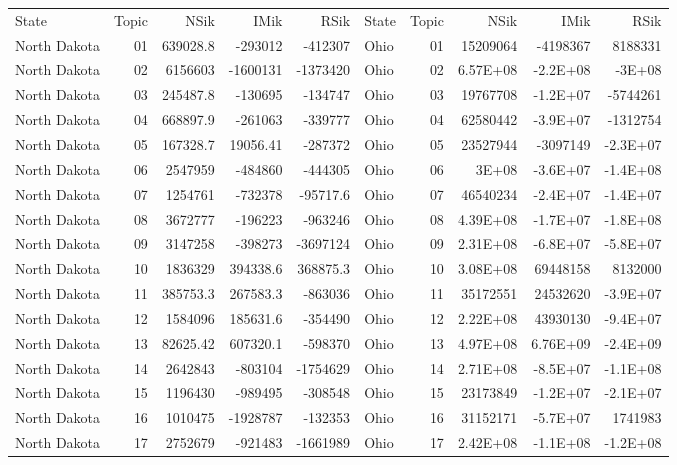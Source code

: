\begin{table}[]
	\footnotesize
	\begin{tabular}{lrrrrlrrrr}
		State & Topic & NSik & IMik & RSik & State & Topic & NSik & IMik & RSik \\
		North Dakota &  01  & 639028.8 & -293012 & -412307 & Ohio &  01  & 15209064 & -4198367 & 8188331 \\
		North Dakota &  02  & 6156603 & -1600131 & -1373420 & Ohio &  02  & 6.57E+08 & -2.2E+08 & -3E+08 \\
		North Dakota &  03  & 245487.8 & -130695 & -134747 & Ohio &  03  & 19767708 & -1.2E+07 & -5744261 \\
		North Dakota &  04  & 668897.9 & -261063 & -339777 & Ohio &  04  & 62580442 & -3.9E+07 & -1312754 \\
		North Dakota &  05  & 167328.7 & 19056.41 & -287372 & Ohio &  05  & 23527944 & -3097149 & -2.3E+07 \\
		North Dakota &  06  & 2547959 & -484860 & -444305 & Ohio &  06  & 3E+08 & -3.6E+07 & -1.4E+08 \\
		North Dakota &  07  & 1254761 & -732378 & -95717.6 & Ohio &  07  & 46540234 & -2.4E+07 & -1.4E+07 \\
		North Dakota &  08  & 3672777 & -196223 & -963246 & Ohio &  08  & 4.39E+08 & -1.7E+07 & -1.8E+08 \\
		North Dakota &  09  & 3147258 & -398273 & -3697124 & Ohio &  09  & 2.31E+08 & -6.8E+07 & -5.8E+07 \\
		North Dakota &  10 & 1836329 & 394338.6 & 368875.3 & Ohio &  10 & 3.08E+08 & 69448158 & 8132000 \\
		North Dakota &  11 & 385753.3 & 267583.3 & -863036 & Ohio &  11 & 35172551 & 24532620 & -3.9E+07 \\
		North Dakota &  12 & 1584096 & 185631.6 & -354490 & Ohio &  12 & 2.22E+08 & 43930130 & -9.4E+07 \\
		North Dakota &  13 & 82625.42 & 607320.1 & -598370 & Ohio &  13 & 4.97E+08 & 6.76E+09 & -2.4E+09 \\
		North Dakota &  14 & 2642843 & -803104 & -1754629 & Ohio &  14 & 2.71E+08 & -8.5E+07 & -1.1E+08 \\
		North Dakota &  15 & 1196430 & -989495 & -308548 & Ohio &  15 & 23173849 & -1.2E+07 & -2.1E+07 \\
		North Dakota &  16 & 1010475 & -1928787 & -132353 & Ohio &  16 & 31152171 & -5.7E+07 & 1741983 \\
		North Dakota &  17 & 2752679 & -921483 & -1661989 & Ohio &  17 & 2.42E+08 & -1.1E+08 & -1.2E+08 \\

\end{tabular}
\end{table}
